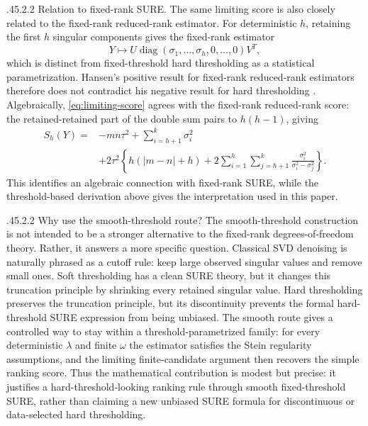\documentclass[12pt,reqno]{amsart}
\makeatletter
\numberwithin{equation}{section}
\def\paragraph{\@startsection{paragraph}{4}{\z@}%
  {.45\linespacing\@plus.2\linespacing}{.2\linespacing}%
  {\normalfont\bfseries}}
\theoremstyle{plain}
\theoremstyle{definition}
\newcommand{\diagop}{\operatorname{diag}}
\makeatother
\begin{document}
\paragraph{Relation to fixed-rank SURE.}
The same limiting score is also closely related to the fixed-rank reduced-rank estimator. For deterministic $h$, retaining the first $h$ singular components gives the fixed-rank estimator
\begin{equation}
    Y\mapsto U\diagop(\sigma_1,\ldots,\sigma_h,0,\ldots,0)V^T,
\end{equation}
which is distinct from fixed-threshold hard thresholding as a statistical parametrization. Hansen's positive result for fixed-rank reduced-rank estimators therefore does not contradict his negative result for hard thresholding \cite{hansen2017comment}. Algebraically, \eqref{eq:limiting-score} agrees with the fixed-rank reduced-rank score: the retained-retained part of the double sum pairs to $h(h-1)$, giving
\begin{equation}
\begin{aligned}
    S_h(Y)
    ={}&-mn\tau^2+\sum_{i=h+1}^{k}\sigma_i^2 \\
    &+2\tau^2\left\{h(|m-n|+h)
    +2\sum_{i=1}^{h}\sum_{j=h+1}^{k}
        \frac{\sigma_i^2}{\sigma_i^2-\sigma_j^2}\right\}.
\end{aligned}
\end{equation}
This identifies an algebraic connection with fixed-rank SURE, while the threshold-based derivation above gives the interpretation used in this paper.

\paragraph{Why use the smooth-threshold route?}
The smooth-threshold construction is not intended to be a stronger alternative to the fixed-rank degrees-of-freedom theory. Rather, it answers a more specific question. Classical SVD denoising is naturally phrased as a cutoff rule: keep large observed singular values and remove small ones. Soft thresholding has a clean SURE theory, but it changes this truncation principle by shrinking every retained singular value. Hard thresholding preserves the truncation principle, but its discontinuity prevents the formal hard-threshold SURE expression from being unbiased. The smooth route gives a controlled way to stay within a threshold-parametrized family: for every deterministic $\lambda$ and finite $\omega$ the estimator satisfies the Stein regularity assumptions, and the limiting finite-candidate argument then recovers the simple ranking score. Thus the mathematical contribution is modest but precise: it justifies a hard-threshold-looking ranking rule through smooth fixed-threshold SURE, rather than claiming a new unbiased SURE formula for discontinuous or data-selected hard thresholding.
\end{document}
